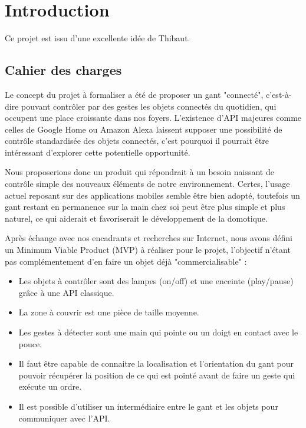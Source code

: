 \documentclass{article}
\begin{document}
    

    
    \tableofcontents

    \section{Introduction}

        Ce projet est issu d'une excellente idée de Thibaut.

        \subsection{Cahier des charges}

        Le concept du projet à formaliser a été de proposer un gant "connecté", 
            c'est-à-dire pouvant contrôler par des gestes les objets connectés du quotidien,
            qui occupent une place croissante dans nos foyers. L'existence d'API majeures comme celles
            de Google Home ou Amazon Alexa laissent supposer une possibilité de contrôle standardisée
            des objets connectés, c'est pourquoi il pourrait être intéressant d'explorer cette
            potentielle opportunité.

        Nous proposerions donc un produit qui répondrait à un besoin naissant de contrôle simple des nouveaux
            éléments de notre environnement. Certes, l'usage actuel reposant sur des applications mobiles
            semble être bien adopté, toutefois un gant restant en permanence sur la main chez soi peut être plus
            simple et plus naturel, ce qui aiderait et favoriserait le développement de la domotique.

        Après échange avec nos encadrants et recherches sur Internet, nous avons défini un Minimum Viable Product (MVP)
            à réaliser pour le projet, l'objectif n'étant pas complémentement d'en faire un objet déjà
            "commercialisable" :
            \begin{itemize}
                \item Les objets à contrôler sont des lampes (on/off) et une enceinte (play/pause) grâce à une API classique.
                \item La zone à couvrir est une pièce de taille moyenne.
                \item Les gestes à détecter sont une main qui pointe ou un doigt en contact avec le pouce.
                \item Il faut être capable de connaitre la localisation et l'orientation du gant pour pouvoir
                        récupérer la position de ce qui est pointé
                        avant de faire un geste qui exécute un ordre.
                \item Il est possible d'utiliser un intermédiaire entre le gant et les objets pour communiquer avec l'API.
            \end{itemize}
\end{document}
